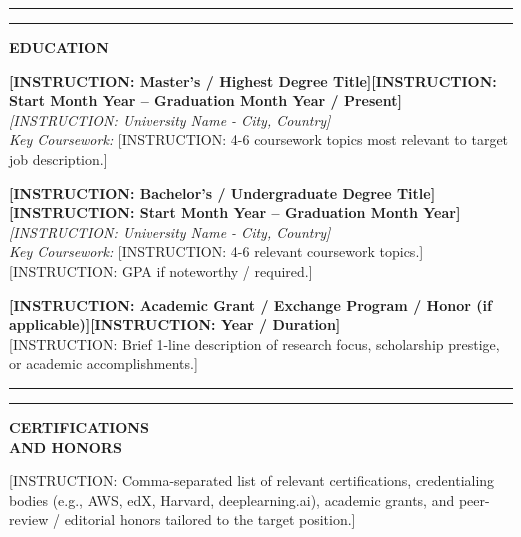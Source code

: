 \documentclass[10pt,a4paper]{article}
\newcommand{\sectionline}{%
  \vspace{4pt}%
  \noindent%
  \begin{minipage}[b]{3.5cm}%
    \color{bannerblue}\rule{\linewidth}{4.5pt}%
  \end{minipage}%
  \hspace{0.3cm}%
  \begin{minipage}[b]{\dimexpr\textwidth-3.8cm\relax}%
    \color{dividerblue}\rule{\linewidth}{1.2pt}%
  \end{minipage}%
  \par \vspace{4pt}%
}
\newcommand{\cvblock}[2]{%
  \vspace{2pt}%
  \noindent%
  \begin{minipage}[t]{3.5cm}%
    \raggedright \bfseries \small \color{textdark} #1%
  \end{minipage}%
  \hspace{0.3cm}%
  \begin{minipage}[t]{\dimexpr\textwidth-3.8cm\relax}%
    \small \color{textdark} #2%
  \end{minipage}%
  \par \vspace{3pt}%
}
\begin{document}
\sectionline
\cvblock{EDUCATION}{%
  \textbf{[INSTRUCTION: Master's / Highest Degree Title]}\hfill \textbf{[INSTRUCTION: Start Month Year -- Graduation Month Year / Present]}\\
  \emph{[INSTRUCTION: University Name - City, Country]}\\
  {\small \emph{Key Coursework:} [INSTRUCTION: 4-6 coursework topics most relevant to target job description.]}

  \vspace{3pt}

  \textbf{[INSTRUCTION: Bachelor's / Undergraduate Degree Title]}\hfill \textbf{[INSTRUCTION: Start Month Year -- Graduation Month Year]}\\
  \emph{[INSTRUCTION: University Name - City, Country]}\\
  {\small \emph{Key Coursework:} [INSTRUCTION: 4-6 relevant coursework topics.] [INSTRUCTION: GPA if noteworthy / required.]}

  \vspace{3pt}

  \textbf{[INSTRUCTION: Academic Grant / Exchange Program / Honor (if applicable)]}\hfill \textbf{[INSTRUCTION: Year / Duration]}\\
  {\small [INSTRUCTION: Brief 1-line description of research focus, scholarship prestige, or academic accomplishments.]}
}

\sectionline
\cvblock{CERTIFICATIONS\\AND HONORS}{%
  [INSTRUCTION: Comma-separated list of relevant certifications, credentialing bodies (e.g., AWS, edX, Harvard, deeplearning.ai), academic grants, and peer-review / editorial honors tailored to the target position.]
}
\end{document}
